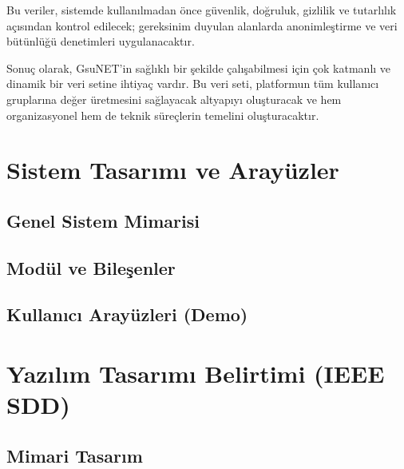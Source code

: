 \documentclass[a4paper,12pt]{report}
\begin{document}
Bu veriler, sistemde kullanılmadan önce güvenlik, doğruluk, gizlilik ve tutarlılık açısından kontrol edilecek; gereksinim duyulan alanlarda anonimleştirme ve veri bütünlüğü denetimleri uygulanacaktır.

\bigskip

Sonuç olarak, GsuNET’in sağlıklı bir şekilde çalışabilmesi için çok katmanlı ve dinamik bir veri setine ihtiyaç vardır. Bu veri seti, platformun tüm kullanıcı gruplarına değer üretmesini sağlayacak altyapıyı oluşturacak ve hem organizasyonel hem de teknik süreçlerin temelini oluşturacaktır.


\chapter{Sistem Tasarımı ve Arayüzler}

\section{Genel Sistem Mimarisi}


\section{Modül ve Bileşenler}


\section{Kullanıcı Arayüzleri (Demo)}


\chapter{Yazılım Tasarımı Belirtimi (IEEE SDD)}


\section{Mimari Tasarım}

\end{document}
